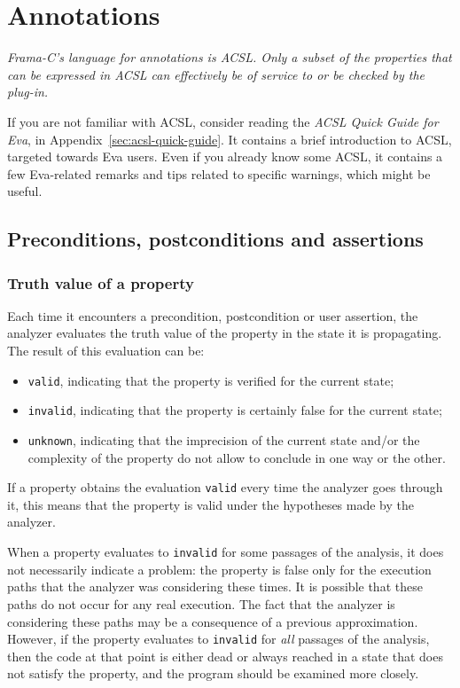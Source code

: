 \documentclass{frama-c-book}
\begin{document}
\chapter{Annotations}\label{annotations}
\vspace{2cm}

{\em Frama-C's language for annotations is ACSL. Only a subset
of the properties that can be expressed in ACSL can effectively
be of service to or be checked by the \Eva{} plug-in.}

\vspace{2cm}

If you are not familiar with ACSL, consider reading the
{\em ACSL Quick Guide for Eva}, in Appendix~\ref{sec:acsl-quick-guide}.
It contains a brief introduction to ACSL, targeted towards Eva users.
Even if you already know some ACSL, it contains a few Eva-related remarks
and tips related to specific warnings, which might be useful.

\section{Preconditions, postconditions and assertions}
\label{prepostasserts}

\subsection{Truth value of a property}

Each time it encounters a precondition, postcondition or user assertion,
the analyzer evaluates the truth value of the property
in the state it is propagating. The result of this evaluation can be:
\begin{itemize}
\item \lstinline|valid|, indicating that the property is verified for the
  current state;
\item \lstinline|invalid|, indicating that the property is certainly false
  for the current state;
\item \lstinline|unknown|, indicating that the imprecision of the current state
and/or the complexity of the property do not allow to conclude in one way or the
other.
\end{itemize}

If a property obtains the evaluation \lstinline|valid| every time the
analyzer goes through it, this means that the property is valid under
the hypotheses made by the analyzer.

When a property evaluates to \lstinline|invalid| for some passages of
the analysis, it does not necessarily indicate a problem: the property
is false only for the execution paths that the analyzer was
considering these times. It is possible that these paths do not
occur for any real execution. The fact that the analyzer is
considering these paths may be a consequence of a previous
approximation. However, if the property evaluates to
\lstinline|invalid| for {\em all} passages of the analysis, then the
code at that point is either dead or always reached in a state that
does not satisfy the property, and the program should be examined more
closely.
\end{document}
